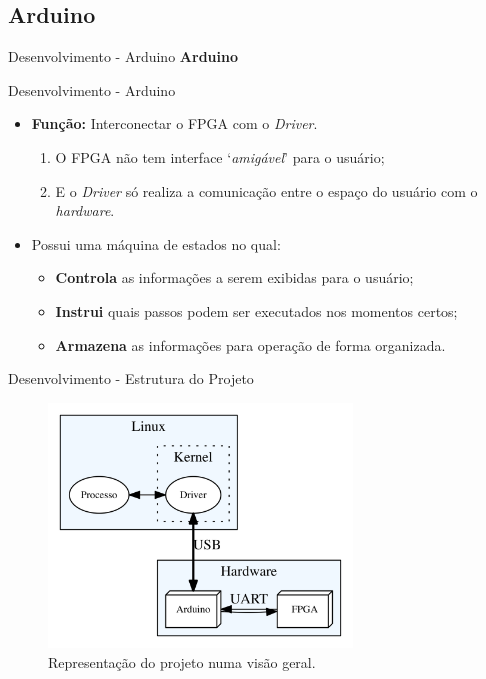 	\subsection{Arduino}
	\begin{frame}{Desenvolvimento - Arduino}
		\centering \color{blue} {\Huge \textbf{Arduino} \\[0.5cm]}
	\end{frame}
	\begin{frame}{Desenvolvimento - Arduino}
		\begin{itemize}
			\setlength\itemsep{2em}
			\item \textbf{Função:} Interconectar o FPGA com o \textit{Driver}.
			\begin{enumerate}
				\setlength\itemsep{1em}
				\item O FPGA não tem interface `\textit{amigável}' para o usuário;
				\item E o \textit{Driver} só realiza a comunicação entre o espaço do usuário com o \textit{hardware}.
			\end{enumerate}
			\item Possui uma máquina de estados no qual:
			\begin{itemize}
				\setlength\itemsep{1em}
				\item \textbf{Controla} as informações a serem exibidas para o usuário;
				\item \textbf{Instrui} quais passos podem ser executados nos momentos certos;
				\item \textbf{Armazena} as informações para operação de forma organizada.
			\end{itemize}
		\end{itemize}
	\end{frame}
	\begin{frame}{Desenvolvimento - Estrutura do Projeto}
		\begin{figure}[p]
			\centering
			\includegraphics[width=0.72\textwidth]{img/projeto.png}
			\caption{Representação do projeto numa visão geral.}
			\label{fig:projeto}
		\end{figure}
	\end{frame}



